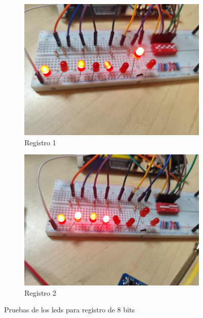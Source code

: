 \begin{figure}[H]
    \centering
    \begin{subfigure}{0.45\linewidth}
        \centering
        \includegraphics[width=\linewidth]{imagenes/Registro1.png}
        \caption{Registro 1}\label{fig:R1}
    \end{subfigure}
    \hfill
    \begin{subfigure}{0.45\linewidth}
        \centering
        \includegraphics[width=\linewidth]{imagenes/Registro2.png}
        \caption{Registro 2}\label{fig:R2}
    \end{subfigure}
    \caption{Pruebas de los leds para registro de 8 bits}\label{fig:leds2}
\end{figure}

